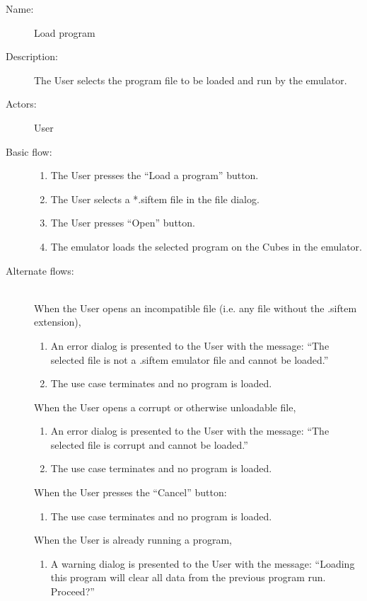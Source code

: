 \documentclass[12pt]{article}
\begin{document}
    \begin{description}
      \item[Name:] Load program
      \item[Description:] The User selects the program file to be loaded and run by the emulator.
      \item[Actors:] User
      \item[Basic flow:] \hfill 
        \begin{enumerate}
	  \item{The User presses the ``Load a program'' button.}
	  \item{The User selects a *.siftem file in the file dialog.}
	  \item{The User presses ``Open'' button.}
	  \item{The emulator loads the selected program on the Cubes in the emulator.}
        \end{enumerate}
      \item[Alternate flows:] \hfill \\
	When the User opens an incompatible file (i.e. any file without the .siftem extension),
        \begin{enumerate}
			\item{An error dialog is presented to the User with the message: ``The selected file is not a .siftem emulator file and cannot be loaded.''}
			\item{The use case terminates and no program is loaded.}
        \end{enumerate}
	When the User opens a corrupt or otherwise unloadable file,
        \begin{enumerate}
			\item{An error dialog is presented to the User with the message: ``The selected file is corrupt and cannot be loaded.''}
			\item{The use case terminates and no program is loaded.}
        \end{enumerate}
	When the User presses the ``Cancel'' button:
        \begin{enumerate}
			\item{The use case terminates and no program is loaded.}
        \end{enumerate}
	When the User is already running a program,
		\begin{enumerate}
			\item{A warning dialog is presented to the User with the message: ``Loading this program will clear all data from the previous program run. Proceed?''}

\end{enumerate}
\end{description}
\end{document}
